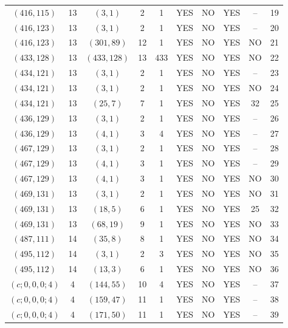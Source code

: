 \begin{longtable}{|c|c|c|c|c|c|c|c|c|c|}
$(416, 115)$ & 13 & $(3, 1)$ & 2 & 1 & YES & NO & YES & -- & 19\\
$(416, 123)$ & 13 & $(3, 1)$ & 2 & 1 & YES & NO & YES & -- & 20\\
$(416, 123)$ & 13 & $(301, 89)$ & 12 & 1 & YES & NO & YES & NO & 21\\
$(433, 128)$ & 13 & $(433, 128)$ & 13 & 433 & YES & NO & YES & NO & 22\\
$(434, 121)$ & 13 & $(3, 1)$ & 2 & 1 & YES & NO & YES & -- & 23\\
$(434, 121)$ & 13 & $(3, 1)$ & 2 & 1 & YES & NO & YES & NO & 24\\
$(434, 121)$ & 13 & $(25, 7)$ & 7 & 1 & YES & NO & YES & 32 & 25\\
$(436, 129)$ & 13 & $(3, 1)$ & 2 & 1 & YES & NO & YES & -- & 26\\
$(436, 129)$ & 13 & $(4, 1)$ & 3 & 4 & YES & NO & YES & -- & 27\\
$(467, 129)$ & 13 & $(3, 1)$ & 2 & 1 & YES & NO & YES & -- & 28\\
$(467, 129)$ & 13 & $(4, 1)$ & 3 & 1 & YES & NO & YES & -- & 29\\
$(467, 129)$ & 13 & $(4, 1)$ & 3 & 1 & YES & NO & YES & NO & 30\\
$(469, 131)$ & 13 & $(3, 1)$ & 2 & 1 & YES & NO & YES & NO & 31\\
$(469, 131)$ & 13 & $(18, 5)$ & 6 & 1 & YES & NO & YES & 25 & 32\\
$(469, 131)$ & 13 & $(68, 19)$ & 9 & 1 & YES & NO & YES & NO & 33\\
$(487, 111)$ & 14 & $(35, 8)$ & 8 & 1 & YES & NO & YES & NO & 34\\
$(495, 112)$ & 14 & $(3, 1)$ & 2 & 3 & YES & NO & YES & NO & 35\\
$(495, 112)$ & 14 & $(13, 3)$ & 6 & 1 & YES & NO & YES & NO & 36\\
$(c; 0, 0, 0; 4)$ & 4 & $(144, 55)$ & 10 & 4 & YES & NO & YES & -- & 37\\
$(c; 0, 0, 0; 4)$ & 4 & $(159, 47)$ & 11 & 1 & YES & NO & YES & -- & 38\\
$(c; 0, 0, 0; 4)$ & 4 & $(171, 50)$ & 11 & 1 & YES & NO & YES & -- & 39
\end{longtable}
